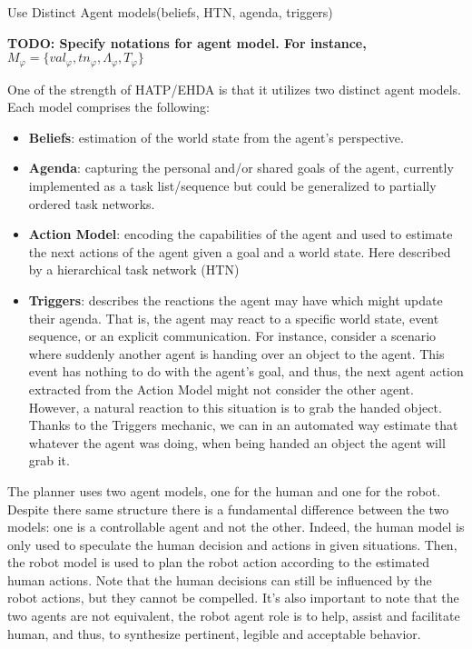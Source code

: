 Use Distinct Agent models(beliefs, HTN, agenda, triggers)

\textbf{TODO: Specify notations for agent model. For instance, $M_\varphi = \{ val_{\varphi}, tn_{\varphi}, \Lambda_{\varphi}, T_{\varphi} \}$}

One of the strength of HATP/EHDA is that it utilizes two distinct agent models. Each model comprises the following:
\begin{itemize}
    \item \textbf{Beliefs}: estimation of the world state from the agent's perspective.
    
    \item \textbf{Agenda}: capturing the personal and/or shared goals of the agent, currently implemented as a task list/sequence but could be generalized to partially ordered task networks.
    
    \item \textbf{Action Model}: encoding the capabilities of the agent and used to estimate the next actions of the agent given a goal and a world state. Here described by a hierarchical task network (HTN)
    
    \item \textbf{Triggers}: describes the reactions the agent may have which might update their agenda. That is, the agent may react to a specific world state, event sequence, or an explicit communication. For instance,  consider a scenario where suddenly another agent is handing over an object to the agent. This event has nothing to do with the agent's goal, and thus, the next agent action extracted from the Action Model might not consider the other agent. However, a natural reaction to this situation is to grab the handed object. Thanks to the Triggers mechanic, we can in an automated way estimate that whatever the agent was doing, when being handed an object the agent will grab it.  

\end{itemize}

The planner uses two agent models, one for the human and one for the robot. Despite there same structure there is a fundamental difference between the two models: one is a controllable agent and not the other. Indeed, the human model is only used to speculate the human decision and actions in given situations. 
Then, the robot model is used to plan the robot action according to the estimated human actions.
Note that the human decisions can still be influenced by the robot actions, but they cannot be compelled.
It's also important to note that the two agents are not equivalent, the robot agent role is to help, assist and facilitate human, and thus, to synthesize pertinent, legible and acceptable behavior.


